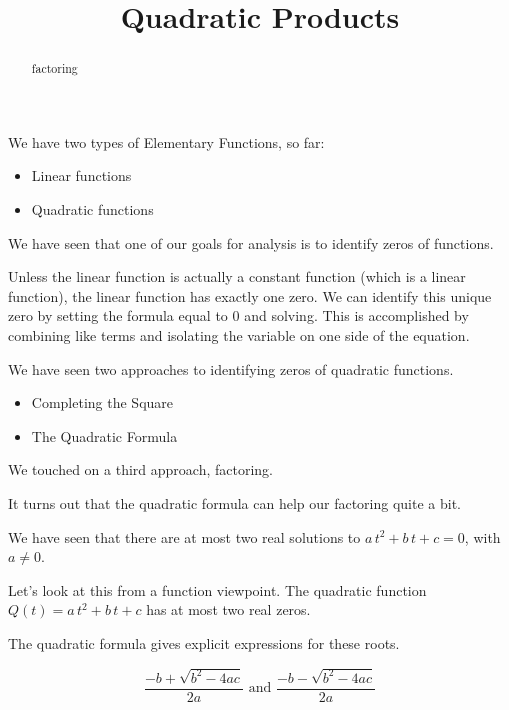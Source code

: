 \documentclass{ximera}
\title{Quadratic Products}
\begin{document}
\begin{abstract}
factoring
\end{abstract}
\maketitle







We have two types of Elementary Functions, so far:

\begin{itemize}
\item Linear functions
\item Quadratic functions
\end{itemize}

We have seen that one of our goals for analysis is to identify zeros of functions. 

Unless the linear function is actually a constant function (which is a linear function), the linear function has exactly one zero. We can identify this unique zero by setting the formula equal to $0$ and solving.  This is accomplished by combining like terms and isolating the variable on one side of the equation.

We have seen two approaches to identifying zeros of quadratic functions.
\begin{itemize}
\item Completing the Square
\item {The Quadratic Formula}
\end{itemize}

We touched on a third approach, factoring. 

It turns out that the quadratic formula can help our factoring quite a bit. 









We have seen that there are at most two real solutions to $a \, t^2 + b \, t + c = 0$, with $a \ne 0$. 

Let's look at this from a function viewpoint.  The quadratic function  $Q(t) = a \, t^2 + b \, t + c$ has at most two real zeros.  

The quadratic formula gives explicit expressions for these roots.


\[   \frac{-b + \sqrt{b^2 - 4 a c}}{2a}     \text{ and }    \frac{-b - \sqrt{b^2 - 4 a c}}{2a}   \]
\end{document}
